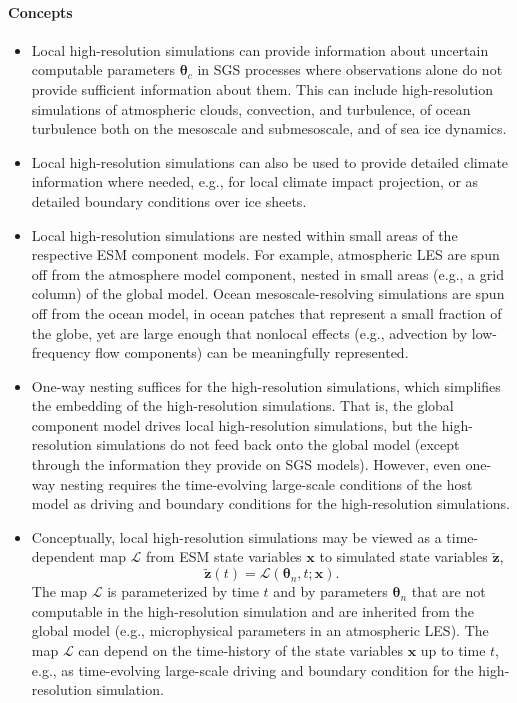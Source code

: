 \documentclass{article}
\renewcommand{\vec}[1]{\boldsymbol{{#1}}}
\begin{document}
\paragraph{Concepts}
\begin{itemize}
    \item Local high-resolution simulations can provide information about uncertain computable parameters $\vec{\theta}_c$ in SGS processes where observations alone do not provide sufficient information about them. This can include high-resolution simulations of atmospheric clouds, convection, and turbulence, of ocean turbulence both on the mesoscale and submesoscale, and of sea ice dynamics. 
    \item Local high-resolution simulations can also be used to provide detailed climate information where needed, e.g., for local climate impact projection, or as detailed boundary conditions over ice sheets.
    \item Local high-resolution simulations are nested within small areas of the respective ESM component models. For example, atmospheric LES are spun off from the atmosphere model component, nested in small areas (e.g., a grid column) of the global model. Ocean mesoscale-resolving simulations are spun off from the ocean model, in ocean patches that represent a small fraction of the globe, yet are large enough that nonlocal effects (e.g., advection by low-frequency flow components) can be meaningfully represented.
    \item One-way nesting suffices for the high-resolution simulations, which simplifies the embedding of the high-resolution simulations. That is, the global component model drives local high-resolution simulations, but the high-resolution simulations do not feed back onto the global model (except through the information they provide on SGS models). However, even one-way nesting requires the time-evolving large-scale conditions of the host model as driving and boundary conditions for the high-resolution simulations. 
    \item Conceptually, local high-resolution simulations may be viewed as a time-depen\-dent map $\mathcal{L}$ from ESM state variables $\vec{x}$  to simulated state variables $\vec{\tilde z}$,
    \begin{equation}
    \vec{\tilde z}(t) = \mathcal{L}(\vec{\theta}_n,t; \vec{x}).
    \end{equation}
    The map $\mathcal{L}$ is parameterized by time $t$ and by parameters $\vec{\theta}_n$ that are not computable in the high-resolution simulation and are inherited from the global model (e.g., microphysical parameters in an atmospheric LES). The map $\mathcal{L}$ can depend on the time-history of the state variables $\vec{x}$ up to time $t$, e.g., as time-evolving large-scale driving and boundary condition for the high-resolution simulation. 

\end{itemize}
\end{document}
